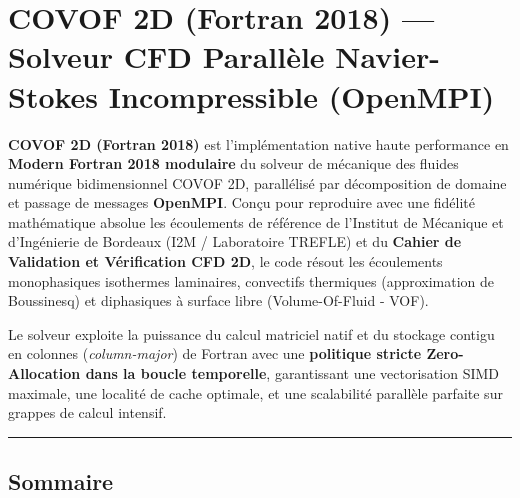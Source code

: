 \documentclass[
  french,
]{article}
\author{}
\date{}
\makeatletter
\newcommand*\pandocbounded[1]{%
  \sbox\pandoc@box{#1}%
  \Gscale@div\@tempa{\textheight}{\dimexpr\ht\pandoc@box+\dp\pandoc@box\relax}%
  \Gscale@div\@tempb{\linewidth}{\wd\pandoc@box}%
  \ifdim\@tempb\p@<\@tempa\p@\let\@tempa\@tempb\fi%
  \ifdim\@tempa\p@<\p@\scalebox{\@tempa}{\usebox\pandoc@box}%
  \else\usebox{\pandoc@box}%
  \fi%
}
\makeatother
\begin{document}
\section{COVOF 2D (Fortran 2018) --- Solveur CFD Parallèle Navier-Stokes
Incompressible
(OpenMPI)}\label{covof-2d-fortran-2018-solveur-cfd-paralluxe8le-navier-stokes-incompressible-openmpi}

\href{https://en.wikipedia.org/wiki/Fortran}{\pandocbounded{}}
\href{https://www.open-mpi.org/}{\pandocbounded{}}
\href{docs/VALIDATION_GUIDE.md}{\pandocbounded{}}
\href{LICENSE}{\pandocbounded{}}

\textbf{COVOF 2D (Fortran 2018)} est l'implémentation native haute
performance en \textbf{Modern Fortran 2018 modulaire} du solveur de
mécanique des fluides numérique bidimensionnel COVOF 2D, parallélisé par
décomposition de domaine et passage de messages \textbf{OpenMPI}. Conçu
pour reproduire avec une fidélité mathématique absolue les écoulements
de référence de l'Institut de Mécanique et d'Ingénierie de Bordeaux (I2M
/ Laboratoire TREFLE) et du \textbf{Cahier de Validation et Vérification
CFD 2D}, le code résout les écoulements monophasiques isothermes
laminaires, convectifs thermiques (approximation de Boussinesq) et
diphasiques à surface libre (Volume-Of-Fluid - VOF).

Le solveur exploite la puissance du calcul matriciel natif et du
stockage contigu en colonnes (\emph{column-major}) de Fortran avec une
\textbf{politique stricte Zero-Allocation dans la boucle temporelle},
garantissant une vectorisation SIMD maximale, une localité de cache
optimale, et une scalabilité parallèle parfaite sur grappes de calcul
intensif.

\begin{center}\rule{0.5\linewidth}{0.5pt}\end{center}

\subsection{Sommaire}\label{sommaire}
\end{document}
